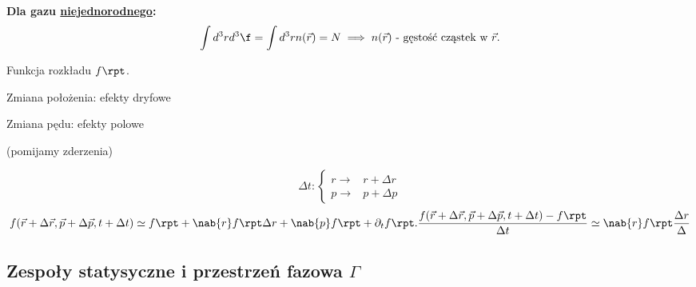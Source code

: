 \textbf{Dla gazu \underline{niejednorodnego}:}
\begin{equation}
\int d^3rd^3\f = \int d^3r n(\vec{r}) = N \implies n(\vec{r}) 
\mbox{ - gęstość cząstek w } \vec{r}.
\end{equation}

Funkcja rozkładu $f\rpt$. 

Zmiana położenia: efekty dryfowe

Zmiana pędu: efekty polowe

(pomijamy zderzenia)

$$ \Delta t:
\begin{cases} r \to & r+\Delta r \\
				p \to & p+\Delta p\end{cases}$$
$$ f(\vec{r}+\Delta\vec{r},\vec{p}+\Delta\vec{p},t+\Delta t) \simeq 
f\rpt +\nab{r} f\rpt \Delta r + \nab{p} f\rpt + \partial_t f\rpt .
\dfrac{f(\vec{r}+\Delta\vec{r},\vec{p}+\Delta\vec{p},t+\Delta t)-f\rpt}{\Delta t}
\simeq \nab{r} f\rpt \frac{\Delta r}{\Delta }
$$
\subsection{Zespoły statysyczne i przestrzeń fazowa $\Gamma$}

